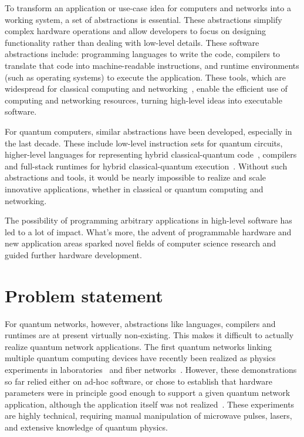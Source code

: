 To transform an application or use-case idea for computers and networks into a working system, a set of abstractions is essential.
These abstractions simplify complex hardware operations and allow developers to focus on designing functionality rather than dealing with low-level details.
These software abstractions include: programming languages to write the code, compilers to translate that code into machine-readable instructions, and runtime environments (such as operating systems) to execute the application.
These tools, which are widespread for classical computing and networking~\cite{aho_compilers_2006, silberschatz_book_2014, james_computer_2016}, enable the efficient use of computing and networking resources, turning high-level ideas into executable software.

For quantum computers, similar abstractions have been developed, especially in the last decade.
These include low-level instruction sets \cite{larose_overview_2019} for quantum circuits, higher-level languages for representing hybrid classical-quantum code~\cite{heim_quantum_2020}, compilers and full-stack runtimes for hybrid classical-quantum execution~\cite{bandic_full-stack_2022}.
Without such abstractions and tools, it would be nearly impossible to realize and scale innovative applications, whether in classical or quantum computing and networking.

The possibility of programming arbitrary applications in high-level software has led to a lot of impact. What's more, the advent of programmable hardware and new application areas sparked novel fields of computer science research and guided further hardware development.



\section{Problem statement}
For quantum networks, however, abstractions like languages, compilers and runtimes are at present virtually non-existing.
This makes it difficult to actually realize quantum network applications.
The first quantum networks linking multiple quantum computing devices have recently been realized as physics experiments in laboratories~\cite{moehring_2007_ion_traps,ritter_2012_elementary,hofmann_2012_heralded,stockill_2017_phasetuned,jing2019entanglement,stephenson_2020_highrate,pompili_2021_multinode,krutyanskiy_entanglement_2023} and fiber networks~\cite{liu2024creation,stolk2024metropolitan,knaut2024entanglement}.
However, these demonstrations so far relied either on ad-hoc software, or chose to establish that hardware parameters were in principle good enough to support a given quantum network application, although the application itself was not realized~\cite{nadlinger_device-independent_2022,liu_2022_photonic_diqkd,zhang_2022_diqkd}.
These experiments are highly technical, requiring manual manipulation of microwave pulses, lasers, and extensive knowledge of quantum physics.

